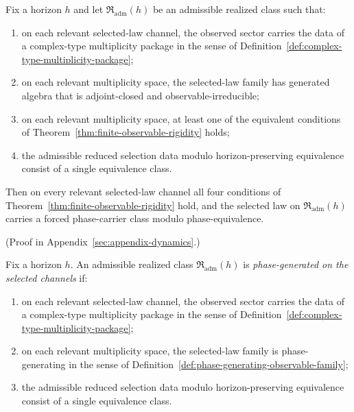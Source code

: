 \begin{corollary}
\label{cor:realized-finite-observable-rigidity}
Fix a horizon $h$ and let $\mathfrak R_{\mathrm{adm}}(h)$ be an admissible
realized class such that:
\begin{enumerate}[label=(\roman*), leftmargin=2em, itemsep=0.2em]
\item on each relevant selected-law channel, the observed sector carries the
      data of a complex-type multiplicity package in the sense of
      Definition~\ref{def:complex-type-multiplicity-package};
\item on each relevant multiplicity space, the selected-law family has
      generated algebra that is adjoint-closed and observable-irreducible;
\item on each relevant multiplicity space, at least one of the equivalent
      conditions of Theorem~\ref{thm:finite-observable-rigidity} holds;
\item the admissible reduced selection data modulo horizon-preserving
      equivalence consist of a single equivalence class.
\end{enumerate}
Then on every relevant selected-law channel all four conditions of
Theorem~\ref{thm:finite-observable-rigidity} hold, and the selected law on
$\mathfrak R_{\mathrm{adm}}(h)$ carries a forced phase-carrier class modulo
phase-equivalence.
\end{corollary}

(Proof in Appendix~\ref{sec:appendix-dynamics}.)

\begin{definition}
\label{def:phase-generated-realized-class}
Fix a horizon $h$. An admissible realized class
$\mathfrak R_{\mathrm{adm}}(h)$ is \emph{phase-generated on the selected
channels} if:
\begin{enumerate}[label=(\roman*), leftmargin=2em, itemsep=0.2em]
\item on each relevant selected-law channel, the observed sector carries the
      data of a complex-type multiplicity package in the sense of
      Definition~\ref{def:complex-type-multiplicity-package};
\item on each relevant multiplicity space, the selected-law family is
      phase-generating in the sense of
      Definition~\ref{def:phase-generating-observable-family};
\item the admissible reduced selection data modulo horizon-preserving
      equivalence consist of a single equivalence class.
\end{enumerate}
\end{definition}

